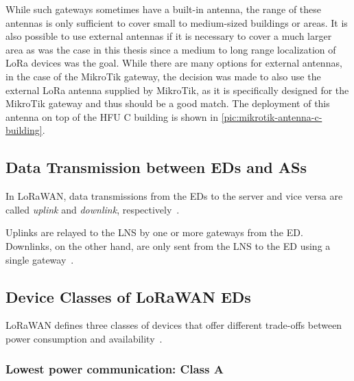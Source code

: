 While such gateways sometimes have a built-in antenna, the range of these antennas is only sufficient to cover small to medium-sized buildings or areas.
It is also possible to use external antennas if it is necessary to cover a much larger area as was the case in this thesis since a medium to long range localization of \ac{LoRa} devices was the goal.
While there are many options for external antennas, in the case of the MikroTik gateway, the decision was made to also use the external \ac{LoRa} antenna supplied by MikroTik, as it is specifically designed for the MikroTik gateway and thus should be a good match.
The deployment of this antenna on top of the \ac{HFU} C building is shown in \cref{pic:mikrotik-antenna-c-building}.

\subsection{Data Transmission between \aclp{ED} and \aclp{AS}}

In LoRaWAN, data transmissions from the \aclp{ED} to the server and vice versa are called \emph{uplink} and \emph{downlink}, respectively~\cite[p. 12]{lora_alliance_inc_lorawan_specification_2017}.

Uplinks are relayed to the \ac{LNS} by one or more gateways from the \acl{ED}.
Downlinks, on the other hand, are only sent from the \ac{LNS} to the \acl{ED} using a single gateway~\cite[p. 12]{lora_alliance_inc_lorawan_specification_2017}.

\subsection{Device Classes of \acs{LoRaWAN} \aclp{ED}}\label{sec:device-classes}

\ac{LoRaWAN} defines three classes of devices that offer different trade-offs between power consumption and availability~\cite[p. 10]{lora_alliance_inc_lorawan_specification_2017}.

\subsubsection{Lowest power communication: Class A}

